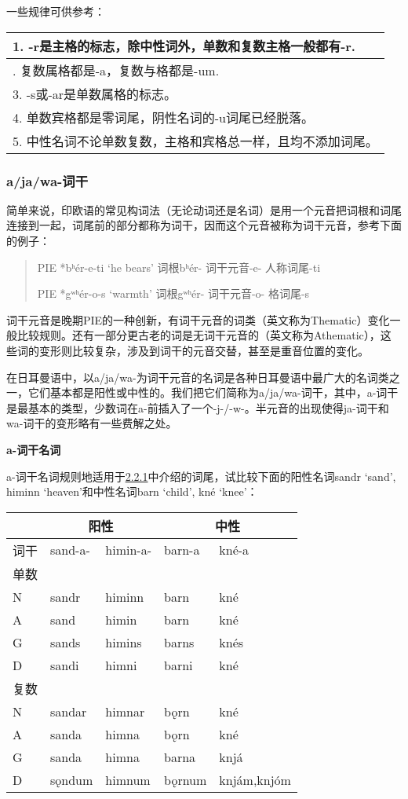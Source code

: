 一些规律可供参考：

\begin{longtable}{l}
\toprule
1. -r是主格的标志，除中性词外，单数和复数主格一般都有-r. \\
\midrule
\endhead
\bottomrule
\endfoot
2. 复数属格都是-a，复数与格都是-um. \\
3. -s或-ar是单数属格的标志。 \\
4. 单数宾格都是零词尾，阴性名词的-u词尾已经脱落。 \\
5. 中性名词不论单数复数，主格和宾格总一样，且均不添加词尾。 \\
\end{longtable}

\subsubsection{a/ja/wa-词干}\label{ajawa-ux8bcdux5e72}

简单来说，印欧语的常见构词法（无论动词还是名词）是用一个元音把词根和词尾连接到一起，词尾前的部分都称为词干，因而这个元音被称为词干元音，参考下面的例子：

\begin{quote}
PIE *bʰér-e-ti `he bears' 词根bʰér- 词干元音-e- 人称词尾-ti

PIE *gʷʰér-o-s `warmth' 词根gʷʰér- 词干元音-o- 格词尾-s
\end{quote}

词干元音是晚期PIE的一种创新，有词干元音的词类（英文称为Thematic）变化一般比较规则。还有一部分更古老的词是无词干元音的（英文称为Athematic），这些词的变形则比较复杂，涉及到词干的元音交替，甚至是重音位置的变化。

在日耳曼语中，以a/ja/wa-为词干元音的名词是各种日耳曼语中最广大的名词类之一，它们基本都是阳性或中性的。我们把它们简称为a/ja/wa-词干，其中，a-词干是最基本的类型，少数词在a-前插入了一个-j-/-w-。半元音的出现使得ja-词干和wa-词干的变形略有一些费解之处。

\textbf{a-词干名词}

a-词干名词规则地适用于\hyperref[ux5f3aux540dux8bcdux7684ux8bcdux5c3e]{2.2.1}中介绍的词尾，试比较下面的阳性名词sandr
`sand', himinn `heaven'和中性名词barn `child', kné `knee'：

\begin{longtable}{lllll}
\toprule
 &\multicolumn{2}{c}{阳性} &\multicolumn{2}{c}{中性} \\
\midrule
\endhead
\bottomrule
\endfoot
词干 & sand-a- & himin-a- & barn-a & kné-a \\
单数 & & & & \\
N & sandr & himinn & barn & kné \\
A & sand & himin & barn & kné \\
G & sands & himins & barns & knés \\
D & sandi & himni & barni & kné \\
复数 & & & & \\
N & sandar & himnar & bǫrn & kné \\
A & sanda & himna & bǫrn & kné \\
G & sanda & himna & barna & knjá \\
D & sǫndum & himnum & bǫrnum & knjám,knjóm \\
\end{longtable}

